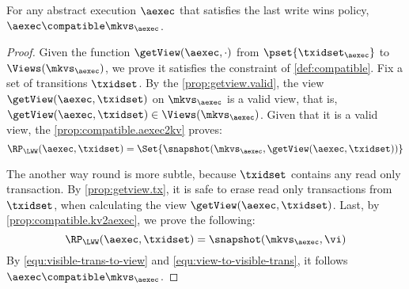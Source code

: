 \begin{theorem}
\label{thm:aexec2kv.compatible}
For any abstract execution $\aexec$ that satisfies the last write wins policy, $\aexec \compatible \mkvs_{\aexec}$.
\end{theorem}
\begin{proof}
Given the function $\getView(\aexec, \cdot )$ from $\pset{\txidset_{\aexec}}$ to $\Views(\mkvs_{\aexec})$,
we prove it satisfies the constraint of \cref{def:compatible}.
Fix a set of transitions \( \txidset \).
By the \cref{prop:getview.valid}, the view $\getView(\aexec, \txidset )$  on \( \mkvs_\aexec \) is a valid view,
that is, \( \getView(\aexec, \txidset ) \in \Views(\mkvs_\aexec) \).
Given that it is a valid view, the \cref{prop:compatible.aexec2kv} proves:
\begin{equation}
    \label{equ:visible-trans-to-view}
    \RP_{\LWW}(\aexec, \txidset) = \Set{\snapshot(\mkvs_{\aexec}, \getView(\aexec, \txidset))} 
\end{equation}

The another way round is more subtle,
because \( \txidset \) contains any read only transaction.
By \cref{prop:getview.tx}, it is safe to erase read only transactions from \( \txidset \),
when calculating the view \( \getView(\aexec, \txidset ) \).
Last, by \cref{prop:compatible.kv2aexec}, we prove the following:
\begin{equation}
    \label{equ:view-to-visible-trans}
    \RP_{\LWW}(\aexec, \txidset) = \snapshot(\mkvs_{\aexec}, \vi)
\end{equation}
By \cref{equ:visible-trans-to-view} and \cref{equ:view-to-visible-trans},
it follows \( \aexec \compatible \mkvs_{\aexec} \).
\end{proof}

